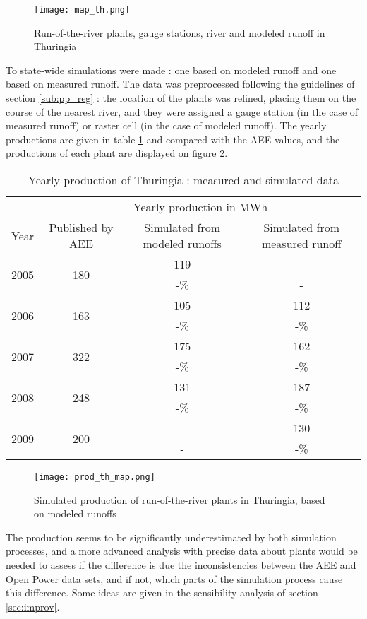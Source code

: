 \begin{figure}[H]
\centering
\texttt{[image: map\_th.png]}
\caption{Run-of-the-river plants, gauge stations, river and modeled runoff in Thuringia}
\label{map_th}
\end{figure}

To state-wide simulations were made : one based on modeled runoff and one based on measured runoff. The data was preprocessed following the guidelines of section \ref{sub:pp_reg} : the location of the plants was refined, placing them on the course of the nearest river, and they were assigned a gauge station (in the case of measured runoff) or raster cell (in the case of modeled runoff). The yearly productions are given in table \ref{res_th} and compared with the AEE values, and the productions of each plant are displayed on figure \ref{prod_th_map}.

\begin{table}[H]
\footnotesize
 \centering
 \caption{Yearly production of Thuringia : measured and simulated data}
 \label{res_th}
 \begin{tabular}{|l|ccc|}
 \hline
  &\multicolumn{3}{c|}{Yearly production in MWh}\\
  Year&Published by AEE&Simulated from modeled runoffs&Simulated from measured runoff\\
  \hline \hline
  \multirow{2}{*}{2005}&\multirow{2}{*}{180}&119&-\\
  &&-\unit[34]{\%}&-\\
  \hline
  \multirow{2}{*}{2006}&\multirow{2}{*}{163}&105&112\\
  &&-\unit[36]{\%}&-\unit[31]{\%}\\
  \hline
  \multirow{2}{*}{2007}&\multirow{2}{*}{322}&175&162\\
  &&-\unit[46]{\%}&-\unit[50]{\%}\\
  \hline
  \multirow{2}{*}{2008}&\multirow{2}{*}{248}&131&187\\
  &&-\unit[47]{\%}&-\unit[25]{\%}\\
  \hline
  \multirow{2}{*}{2009}&\multirow{2}{*}{200}&-&130\\
  &&-&-\unit[35]{\%}\\
  \hline
 \end{tabular}
\end{table}

\begin{figure}[H]
\centering
\texttt{[image: prod\_th\_map.png]}
\caption{Simulated production of run-of-the-river plants in Thuringia, based on modeled runoffs}
\label{prod_th_map}
\end{figure}
 
The production seems to be significantly underestimated by both simulation processes, and a more advanced analysis with precise data about plants would be needed to assess if the difference is due the inconsistencies between the AEE and Open Power data sets, and if not, which parts of the simulation process cause this difference. Some ideas are given in the sensibility analysis of section \ref{sec:improv}.